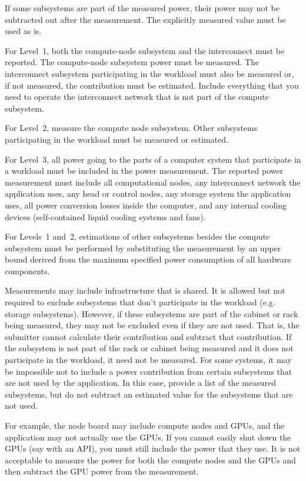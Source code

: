 \noindent
If some subsystems are part of the measured power, their power may not be subtracted out after the measurement.
The explicitly measured value must be used as is.
\wl

\noindent
For Level~1, both the compute-node subsystem and the interconnect must be reported.
The compute-node subsystem power must be measured.
The interconnect subsystem participating in the workload must also be measured or, if not measured, the contribution must be estimated.
Include everything that you need to operate the interconnect network that is not part of the compute subsystem.
\wl

\noindent
For Level~2, measure the compute node subsystem.
Other subsystems participating in the workload must be measured or estimated.
\wl

\noindent
For Level~3, all power going to the parts of a computer system that participate in a workload must be included in the power measurement.
The reported power measurement must include all computational nodes, any interconnect network the application uses, any head or control nodes, any storage system the application uses, all power conversion losses inside the computer, and any internal cooling devices (self-contained liquid cooling systems and fans).
\wl

\noindent
For Levels~1 and~2, estimations of other subsystems besides the compute subsystem must be performed by substituting the measurement by an upper bound derived from the maximum specified power consumption of all hardware components.
\wl

\noindent
Measurements may include infrastructure that is shared.
It is allowed but not required to exclude subsystems that don't participate in the workload (e.g. storage subsystems).
However, if these subsystems are part of the cabinet or rack being measured, they may not be excluded even if they are not used.
That is, the submitter cannot calculate their contribution and subtract that contribution.
If the subsystem is not part of the rack or cabinet being measured and it does not participate in the workload, it need not be measured.
For some systems, it may be impossible not to include a power contribution from certain subsystems that are not used by the application.
In this case, provide a list of the measured subsystems, but do not subtract an estimated value for the subsystems that are not used.
\wl

\noindent
For example, the node board may include compute nodes and GPUs, and the application may not actually use the GPUs.
If you cannot easily shut down the GPUs (say with an API), you must still include the power that they use.
It is not acceptable to measure the power for both the compute nodes and the GPUs and then subtract the GPU power from the measurement.
\wl

